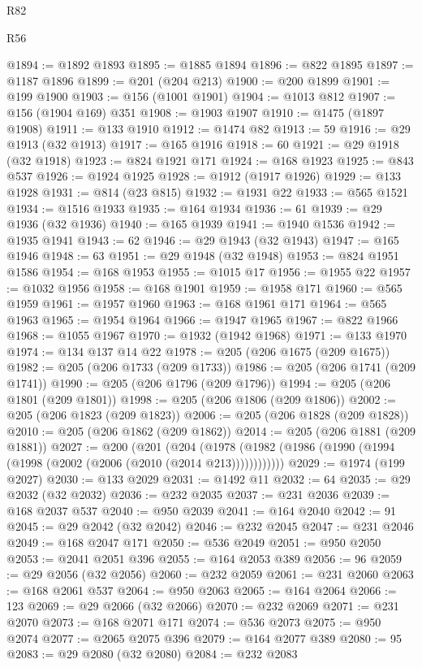 \begin{lexlean}{R82}
\begin{lexlean}{R56}
\begin{coremodule}
{{{{{{{{{{{{{{{{{{{{{{{{{{{{{{{{{{{{{{{{{{{{{{{{{{{{{{{{{{{{{{{{{{{{{{{{{{{{{{{{{{{{{{{{{{{{{{{{{{{{{{{{{{{{{{{{{{{{{{{{{{{{{{{{{{{{{{{{{{{{{{{{{{{{{{{{{{{{{{{{{{{{{{{{{{{{{{{{{{{{{{{{{{{{{{{{{{{{{{{{{{{{{{{{{{{@1894 := @1892 @1893
@1895 := @1885 @1894
@1896 := @822 @1895
@1897 := @1187 @1896
@1899 := @201 (@204 @213)
@1900 := @200 @1899
@1901 := @199 @1900
@1903 := @156 (@1001 @1901)
@1904 := @1013 @812
@1907 := @156 (@1904 @169) @351
@1908 := @1903 @1907
@1910 := @1475 (@1897 @1908)
@1911 := @133 @1910
@1912 := @1474 @82
@1913 := 59
@1916 := @29 @1913 (@32 @1913)
@1917 := @165 @1916
@1918 := 60
@1921 := @29 @1918 (@32 @1918)
@1923 := @824 @1921 @171
@1924 := @168 @1923
@1925 := @843 @537
@1926 := @1924 @1925
@1928 := @1912 (@1917 @1926)
@1929 := @133 @1928
@1931 := @814 (@23 @815)
@1932 := @1931 @22
@1933 := @565 @1521
@1934 := @1516 @1933
@1935 := @164 @1934
@1936 := 61
@1939 := @29 @1936 (@32 @1936)
@1940 := @165 @1939
@1941 := @1940 @1536
@1942 := @1935 @1941
@1943 := 62
@1946 := @29 @1943 (@32 @1943)
@1947 := @165 @1946
@1948 := 63
@1951 := @29 @1948 (@32 @1948)
@1953 := @824 @1951 @1586
@1954 := @168 @1953
@1955 := @1015 @17
@1956 := @1955 @22
@1957 := @1032 @1956
@1958 := @168 @1901
@1959 := @1958 @171
@1960 := @565 @1959
@1961 := @1957 @1960
@1963 := @168 @1961 @171
@1964 := @565 @1963
@1965 := @1954 @1964
@1966 := @1947 @1965
@1967 := @822 @1966
@1968 := @1055 @1967
@1970 := @1932 (@1942 @1968)
@1971 := @133 @1970
@1974 := @134 @137 @14 @22
@1978 := @205 (@206 @1675 (@209 @1675))
@1982 := @205 (@206 @1733 (@209 @1733))
@1986 := @205 (@206 @1741 (@209 @1741))
@1990 := @205 (@206 @1796 (@209 @1796))
@1994 := @205 (@206 @1801 (@209 @1801))
@1998 := @205 (@206 @1806 (@209 @1806))
@2002 := @205 (@206 @1823 (@209 @1823))
@2006 := @205 (@206 @1828 (@209 @1828))
@2010 := @205 (@206 @1862 (@209 @1862))
@2014 := @205 (@206 @1881 (@209 @1881))
@2027 := @200
    (@201
      (@204 (@1978 (@1982 (@1986 (@1990 (@1994 (@1998 (@2002 (@2006 (@2010 (@2014 @213))))))))))))
@2029 := @1974 (@199 @2027)
@2030 := @133 @2029
@2031 := @1492 @11
@2032 := 64
@2035 := @29 @2032 (@32 @2032)
@2036 := @232 @2035
@2037 := @231 @2036
@2039 := @168 @2037 @537
@2040 := @950 @2039
@2041 := @164 @2040
@2042 := 91
@2045 := @29 @2042 (@32 @2042)
@2046 := @232 @2045
@2047 := @231 @2046
@2049 := @168 @2047 @171
@2050 := @536 @2049
@2051 := @950 @2050
@2053 := @2041 @2051 @396
@2055 := @164 @2053 @389
@2056 := 96
@2059 := @29 @2056 (@32 @2056)
@2060 := @232 @2059
@2061 := @231 @2060
@2063 := @168 @2061 @537
@2064 := @950 @2063
@2065 := @164 @2064
@2066 := 123
@2069 := @29 @2066 (@32 @2066)
@2070 := @232 @2069
@2071 := @231 @2070
@2073 := @168 @2071 @171
@2074 := @536 @2073
@2075 := @950 @2074
@2077 := @2065 @2075 @396
@2079 := @164 @2077 @389
@2080 := 95
@2083 := @29 @2080 (@32 @2080)
@2084 := @232 @2083
}}}}}}}}}}}}}}}}}}}}}}}}}}}}}}}}}}}}}}}}}}}}}}}}}}}}}}}}}}}}}}}}}}}}}}}}}}}}}}}}}}}}}}}}}}}}}}}}}}}}}}}}}}}}}}}}}}}}}}}}}}}}}}}}}}}}}}}}}}}}}}}}}}}}}}}}}}}}}}}}}}}}}}}}}}}}}}}}}}}}}}}}}}}}}}}}}}}}}}}}}}}}}}}}}}}
\end{coremodule}
\end{lexlean}
\end{lexlean}
